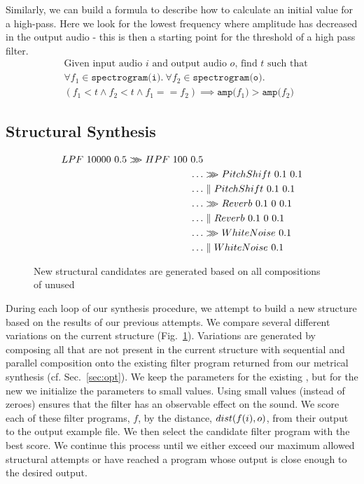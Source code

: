 Similarly, we can build a formula to describe how to calculate an initial value for a high-pass.
Here we look for the lowest frequency where amplitude has decreased in the output audio - this is then a starting point for the threshold of a high pass filter.
%
\begin{align*}
&\text{Given input audio }i\text{ and output audio }o\text{, find }t\text{ such that} \\
&\forall f_1 \in \texttt{spectrogram(i)}.\ \forall f_2 \in \texttt{spectrogram(o)}. \\
&(f_1 < t \land f_2 < t \land f_1 == f_2) \implies \texttt{amp(}f_1\texttt{)} > \texttt{amp(} f_2 \texttt{)} 
\end{align*}


\subsection{Structural Synthesis}

\begin{figure}
\begin{align*}
	LPF \ 10000 \ 0.5 \arrComp HPF \ 100 \ 0.5 & \\
	\ldots & \arrComp PitchShift \ 0.1 \ 0.1 \\
	\ldots & \parallelCompose PitchShift \ 0.1 \ 0.1 \\
	\ldots & \arrComp Reverb \ 0.1 \ 0 \ 0.1 \\
	\ldots & \parallelCompose Reverb \ 0.1 \ 0 \ 0.1 \\
	\ldots & \arrComp WhiteNoise \ 0.1 \\
	\ldots & \parallelCompose WhiteNoise \ 0.1
\end{align*}
\caption{New structural candidates are generated based on all compositions of unused \dspnode}
\label{fig:generation}
\end{figure}

During each loop of our synthesis procedure, we attempt to build a new structure based on the results of our previous attempts.
We compare several different variations on the current structure (Fig.~\ref{fig:generation}).
Variations are generated by composing all \dspnode that are not present in the current structure with sequential and parallel composition onto the existing filter program returned from our metrical synthesis (cf. Sec.~\ref{sec:opt}).
We keep the parameters for the existing \dspnode, but for the new \dspnode we initialize the parameters to small values.
Using small values (instead of zeroes) ensures that the filter has an observable effect on the sound.
We score each of these filter programs, $f$, by the distance, $dist(f(i), o)$, from their output to the output example file.
We then select the candidate filter program with the best score.
We continue this process until we either exceed our maximum allowed structural attempts or have reached a program whose output is close enough to the desired output.
